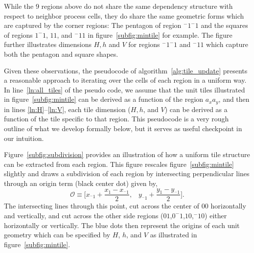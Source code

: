 While the 9 regions above do not share the same dependency structure with respect to neighbor process cells,
they do share the same geometric forms which are captured by the corner regions: The pentagon of region
$^-1^-1$ and the squares of regions $1^-1$, $11$, and $^-11$ in figure~\ref{subfig:mintile} for example.
  The figure further illustrates dimensions
$H,h$ and $V$ for regions $^-1^-1$ and $^-11$ which capture both the pentagon and square shapes.

Given these observations, the pseudocode
of algorithm~\ref{alg:tile_update} presents a
reasonable approach to iterating over the cells of each
region in a uniform way.
  In line~\ref{ln:all_tiles} of the pseudo code, we assume that the unit tiles
 illustrated in figure~\ref{subfig:mintile} can be derived as a function of
 the region $a_xa_y$, and then in lines \ref{ln:H}--\ref{ln:V},
  each tile dimension ($H,h$, and $V$) can
 be derived as a function of the tile specific to that region.
 This pseudocode is a very rough outline of
 what we develop formally below, but it serves as
 useful checkpoint in our intuition.

Figure~\ref{subfig:subdivision} provides an illustration of how
a uniform tile structure can be extracted from each region.
This figure rescales figure~\ref{subfig:mintile} slightly and draws
a subdivision of each region
by intersecting perpendicular lines through an origin term (black center dot)
given by,
\begin{equation}
  \mathcal{O} \equiv \bigl[x_{^-1} + \frac{x_1 - x_{^-1}}{2}, \;\;\; y_{^-1} + \frac{y_1 - y_{^-1}}{2} \bigl].
  \label{eq:O}
\end{equation}
The intersecting lines through this point, cut across the center of $00$ horizontally and vertically,
and cut across the other side regions
($01$,$0^-1$,$10$,$^-10$) either horizontally or vertically.  The blue dots then represent the
origins of each unit geometry which can be specified by $H$, $h$, and $V$ as illustrated
in figure~\ref{subfig:mintile}.


